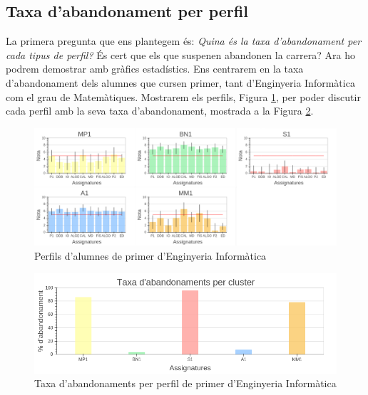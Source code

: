 \documentclass[12pt,a4paper,catalan]{article}
\begin{document}
\newpage

\subsection{Taxa d'abandonament per perfil}
La primera pregunta que ens plantegem és: \textit{Quina és la taxa d'abandonament per cada tipus de perfil?} És cert que els que suspenen abandonen la carrera? Ara ho podrem demostrar amb gràfics estadístics. Ens centrarem en la taxa d'abandonament dels alumnes que cursen primer, tant d'Enginyeria Informàtica com el grau de Matemàtiques. Mostrarem els perfils, Figura \ref{fig:tap}, per poder discutir cada perfil amb la seva taxa d'abandonament, mostrada a la Figura \ref{fig:abandonamentprimer}.

\begin{figure}[h]
\centering
\includegraphics[width=\linewidth]{img/perfils_primer_info.png}
\caption{Perfils d'alumnes de primer d'Enginyeria Informàtica}
\label{fig:tap}
\end{figure}

\begin{figure}[h]
\centering
\includegraphics[width=\linewidth]{img/abandonaments_primer_info.png}
\caption{Taxa d'abandonaments per perfil de primer d'Enginyeria Informàtica}
\label{fig:abandonamentprimer}
\end{figure}
\end{document}
